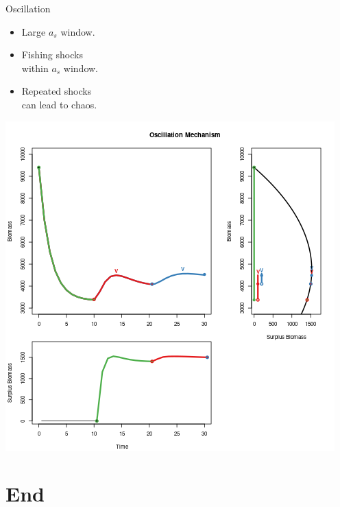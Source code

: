 \documentclass[ xcolor = pdftex, dvipsnames, table ]{beamer}
\begin{document}
%
\begin{frame}{Oscillation}
        \begin{minipage}[h!]{0.39\textwidth}
	\begin{itemize}
        \setlength\itemsep{1em}
	\item Large $a_s$ window.
	\item Fishing shocks \\within $a_s$ window.
	\item Repeated shocks \\can lead to chaos.
	\end{itemize}
	\end{minipage}
        \begin{minipage}[h!]{0.59\textwidth}
	\includegraphics[width=\textwidth]{../../ddBias/shockBiomassSurplus.png}
	\end{minipage}
\end{frame}


%
\section{End}
\end{document}
